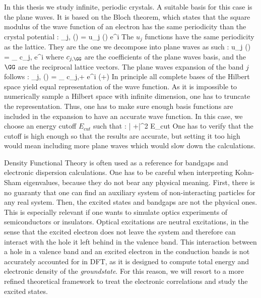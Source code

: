In this thesis we study infinite, periodic crystals. A suitable basis for this case is the plane waves. It is based on the Bloch theorem, which states that the square modulus of the wave function of an electron has the same periodicity than the crystal potential :
\be
 	\phi_{j,\kk} (\rr) = u_j (\rr) e^{i\kk\cdot\rr}
\ee
The $u_j$ functions have the same periodicity as the lattice. They are the one we decompose into plane waves as such :
\be
 	u_j (\rr) = \sum_{\GG} c_{j,\GG} e^{i\GG \cdot \rr}
\ee
where $c_{j,\GG}$ are the coefficients of the plane waves basis, and the $\GG$ are the reciprocal lattice vectors. The plane waves expansion of the band $j$ follows :
\be
	\phi_{j,\kk} (\rr) = \sum_{\GG} c_{j,\kk+\GG} e^{i (\kk+\GG)\cdot \rr}
\ee
In principle all complete bases of the Hilbert space yield equal representation of the wave function. As it is impossible to numerically sample a Hilbert space with infinite dimension, one has to truncate the representation. Thus, one has to make sure enough basis functions are included in the expansion to have an accurate wave function.
In this case, we choose an energy cutoff $E_{cut}$ such that :
\be
	 \left| \kk+\GG \right|^2 \leq E_{cut}
\ee
One has to verify that the cutoff is high enough so that the results are accurate, but setting it too high would mean including more plane waves which would slow down the calculations. \newline

Density Functional Theory is often used as a reference for bandgaps and electronic dispersion calculations. One has to be careful when interpreting Kohn-Sham eigenvalues, because they do not bear any physical meaning. First, there is no guaranty that one can find an auxiliary system of non-interacting particles for any real system. Then, the excited states and bandgaps are not the physical ones. This is especially relevant if one wants to simulate optics experiments of semiconductors or insulators. Optical excitations are neutral excitations, in the sense that the excited electron does not leave the system and therefore can interact with the hole it left behind in the valence band. This interaction between a hole in a valence band and an excited electron in the conduction bands is not accurately accounted for in \gls{DFT}, as it is designed to compute total energy and electronic density of the \textit{groundstate}. For this reason, we will resort to a more refined theoretical framework to treat the electronic correlations and study the excited states.


